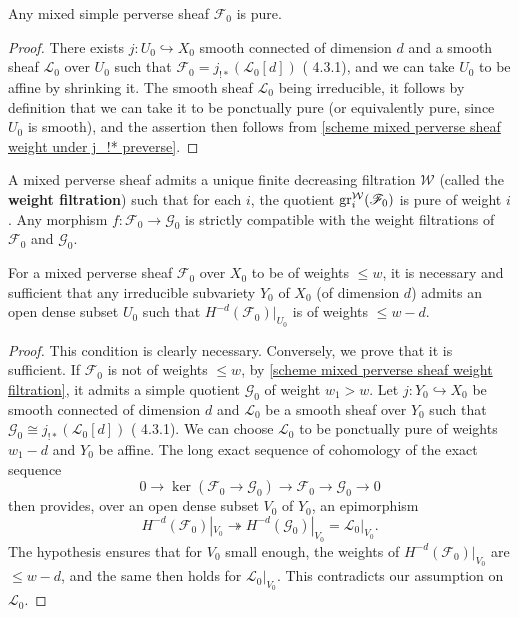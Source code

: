 \begin{corollary}
Any mixed simple perverse sheaf $\mathscr{F}_0$ is pure.
\end{corollary}
\begin{proof}
There exists $j:U_0\hookrightarrow X_0$ smooth connected of dimension $d$ and a smooth sheaf $\mathscr{L}_0$ over $U_0$ such that $\mathscr{F}_0=j_{!*}(\mathscr{L}_0[d])$ (\cite{BBD} 4.3.1), and we can take $U_0$ to be affine by shrinking it. The smooth sheaf $\mathscr{L}_0$ being irreducible, it follows by definition that we can take it to be ponctually pure (or equivalently pure, since $U_0$ is smooth), and the assertion then follows from \cref{scheme mixed perverse sheaf weight under j_!* preverse}.
\end{proof}

\begin{theorem}\label{scheme mixed perverse sheaf weight filtration}
A mixed perverse sheaf admits a unique finite decreasing filtration $\mathcal{W}$ (called the \textbf{weight filtration}) such that for each $i$, the quotient $\mathrm{gr}_i^\mathcal{W}(\mathscr{F}_0)$ is pure of weight $i$. Any morphism $f:\mathscr{F}_0\to\mathscr{G}_0$ is strictly compatible with the weight filtrations of $\mathscr{F}_0$ and $\mathscr{G}_0$.
\end{theorem}

\begin{corollary}\label{scheme mixed perverse sheaf weight iff irredcuibel subvariety}
For a mixed perverse sheaf $\mathscr{F}_0$ over $X_0$ to be of weights $\leq w$, it is necessary and sufficient that any irreducible subvariety $Y_0$ of $X_0$ (of dimension $d$) admits an open dense subset $U_0$ such that $H^{-d}(\mathscr{F}_0)|_{U_0}$ is of weights $\leq w-d$.
\end{corollary}
\begin{proof}
This condition is clearly necessary. Conversely, we prove that it is sufficient. If $\mathscr{F}_0$ is not of weights $\leq w$, by \cref{scheme mixed perverse sheaf weight filtration}, it admits a simple quotient $\mathscr{G}_0$ of weight $w_1>w$. Let $j:Y_0\hookrightarrow X_0$ be smooth connected of dimension $d$ and $\mathscr{L}_0$ be a smooth sheaf over $Y_0$ such that $\mathscr{G}_0\cong j_{!*}(\mathscr{L}_0[d])$ (\cite{BBD} 4.3.1). We can choose $\mathscr{L}_0$ to be ponctually pure of weights $w_1-d$ and $Y_0$ be affine. The long exact sequence of cohomology of the exact sequence
\[0\to\ker(\mathscr{F}_0\to\mathscr{G}_0)\to\mathscr{F}_0\to\mathscr{G}_0\to 0\]
then provides, over an open dense subset $V_0$ of $Y_0$, an epimorphism
\[H^{-d}(\mathscr{F}_0)|_{V_0}\twoheadrightarrow H^{-d}(\mathscr{G}_0)|_{V_0}=\mathscr{L}_0|_{V_0}.\]
The hypothesis ensures that for $V_0$ small enough, the weights of $H^{-d}(\mathscr{F}_0)|_{V_0}$ are $\leq w-d$, and the same then holds for $\mathscr{L}_0|_{V_0}$. This contradicts our assumption on $\mathscr{L}_0$.
\end{proof}

